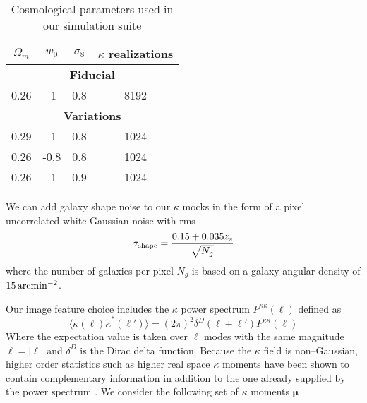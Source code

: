 \documentclass[reprint,aps,prd,superscriptaddress,showkeys,showpacs]{revtex4-1}
\begin{document}
\begin{table}
\begin{center}

\begin{tabular}{c|c|c|c}

$\Omega_m$ & $w_0$ & $\sigma_8$ & $\kappa$ realizations \\ \hline \hline
\multicolumn{4}{c}{\textbf{Fiducial}} \\ \hline
0.26 & -1 & 0.8 & 8192 \\ \hline

\multicolumn{4}{c}{\textbf{Variations}} \\ \hline
0.29 & -1 & 0.8 & 1024 \\
0.26 & -0.8 & 0.8 & 1024 \\
0.26 & -1 & 0.9 & 1024 \\ \hline

\end{tabular}

\end{center}

\caption{Cosmological parameters used in our simulation suite}
\label{tab:cosmopar}

\end{table}

We can add galaxy shape noise to our $\kappa$ mocks in the form of a pixel uncorrelated white Gaussian noise \citep{SongKnox} with rms
\begin{equation}
\label{par:shaperms}
\sigma_{\rm shape} = \frac{0.15+0.035z_s}{\sqrt{N_g}}
\end{equation}
%
where the number of galaxies per pixel $N_g$ is based on a galaxy angular density of $15\,{\rm arcmin}^{-2}$. 

Our image feature choice includes the $\kappa$ power spectrum $P^{\kappa\kappa}(\ell)$ defined as 
\begin{equation}
\label{par:powerdef}
\langle\tilde{\kappa}(\pmb{\ell})\tilde{\kappa}^*(\pmb{\ell}')\rangle = (2\pi)^2\delta^D(\pmb{\ell}+\pmb{\ell}')P^{\kappa\kappa}(\ell) 
\end{equation}
%
Where the expectation value is taken over $\pmb{\ell}$ modes with the same magnitude $\ell=\vert\pmb{\ell}\vert$ and $\delta^D$ is the Dirac delta function. Because the $\kappa$ field is non--Gaussian, higher order statistics such as higher real space $\kappa$ moments have been shown to contain complementary information in addition to the one already supplied by the power spectrum \citep{MinkPetri,CFHTMink,NG-Jain1,NG-Jain2}. We consider the following set of $\kappa$ moments $\pmb{\mu}$
\end{document}
